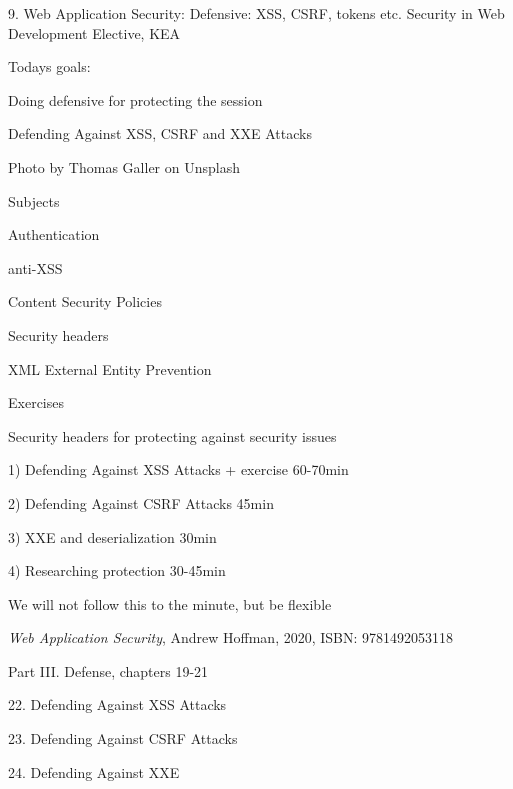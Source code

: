 \documentclass[Screen16to9,17pt]{foils}
\begin{document}
\mytitlepage
{9. Web Application Security: Defensive: XSS, CSRF, tokens etc.}
{Security in Web Development Elective, KEA}




Todays goals:
\begin{list2}
\item Doing defensive for protecting the session
\item Defending Against XSS, CSRF and XXE Attacks
\end{list2}

Photo by Thomas Galler on Unsplash




\begin{list1}
\item Subjects
\begin{list2}
\item Authentication
\item anti-XSS
\item Content Security Policies
\item Security headers
\item XML External Entity Prevention
\end{list2}
\item Exercises
\begin{list2}
\item Security headers for protecting against security issues
\end{list2}
\end{list1}


\begin{list2}
\item 1) Defending Against XSS Attacks + exercise 60-70min
\item 2) Defending Against CSRF Attacks 45min
\item 3) XXE and deserialization 30min
\item 4) Researching protection 30-45min
\end{list2}

We will not follow this to the minute, but be flexible


\emph{Web Application Security}, Andrew Hoffman, 2020, ISBN: 9781492053118

\begin{list1}
\item Part III. Defense, chapters 19-21
\item 22. Defending Against XSS Attacks
\item 23. Defending Against CSRF Attacks
\item 24. Defending Against XXE
\end{list1}
\end{document}
